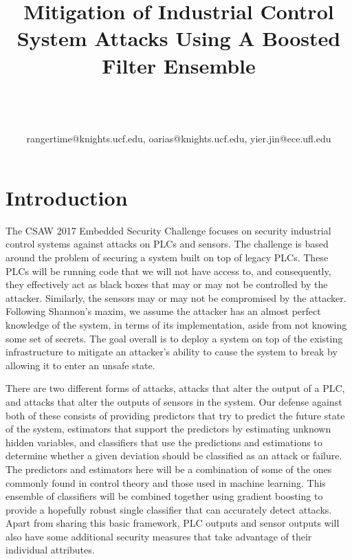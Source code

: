 \documentclass[10pt,twocolumn]{IEEEtran}
\begin{document}
\title{Mitigation of Industrial Control System Attacks Using A Boosted Filter Ensemble}

\author{\\
\\
\\
{rangertime@knights.ucf.edu, oarias@knights.ucf.edu, yier.jin@ece.ufl.edu}\vspace{-0.16in}\vspace{-0.2in}}

\maketitle
\pagestyle{empty}
\thispagestyle{empty}

\begin{abstract}

\end{abstract}

\section{Introduction}
The CSAW 2017 Embedded Security Challenge focuses on security industrial control systems against attacks on PLCs and sensors.
The challenge is based around the problem of securing a system built on top of legacy PLCs.
These PLCs will be running code that we will not have access to, and consequently, they effectively act as black boxes that may or may not be controlled by the attacker.
Similarly, the sensors may or may not be compromised by the attacker.
Following Shannon's maxim, we assume the attacker has an almost perfect knowledge of the system, in terms of its implementation, aside from not knowing some set of secrets.
The goal overall is to deploy a system on top of the existing infrastructure to mitigate an attacker's ability to cause the system to break by allowing it to enter an unsafe state.

There are two different forms of attacks, attacks that alter the output of a PLC, and attacks that alter the outputs of sensors in the system.
Our defense against both of these consists of providing predictors that try to predict the future state of the system, estimators that support the predictors by estimating unknown hidden variables, and classifiers that use the predictions and estimations to determine whether a given deviation should be classified as an attack or failure.
The predictors and estimators here will be a combination of some of the ones commonly found in control theory and those used in machine learning.
This ensemble of classifiers will be combined together using gradient boosting to provide a hopefully robust single classifier that can accurately detect attacks.
Apart from sharing this basic framework, PLC outputs and sensor outputs will also have some additional security measures that take advantage of their individual attributes.
\end{document}
